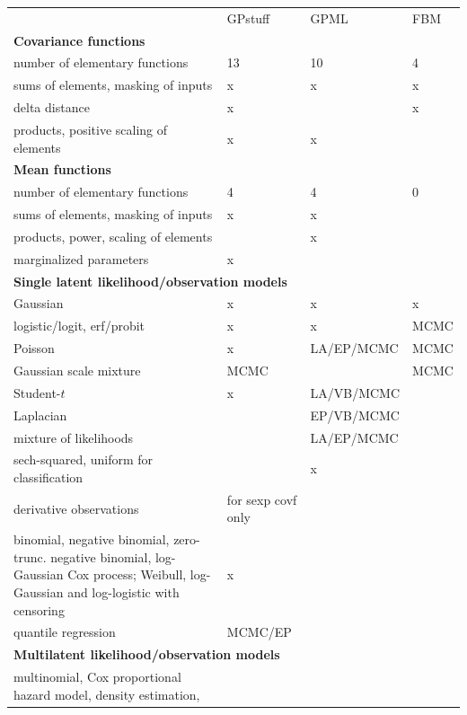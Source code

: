 \documentclass[twoside,11pt]{article}
\begin{document}
\begin{table}
  \scriptsize
  \begin{tabular}{p{9.5cm}p{2.3cm}p{2.1cm}p{0.9cm}}
    & GPstuff & GPML & FBM \\
    \textbf{Covariance functions} &  &  & \\
    \hline
    number of elementary functions & 13 & 10 & 4 \\
    sums of elements, masking of inputs  & x & x & x \\
    delta distance & x & & x \\
    products, positive scaling of elements & x & x &  \\    
    \multicolumn{4}{l}{\textbf{Mean functions}} \\
    \hline
    number of elementary functions & 4 & 4 & 0 \\
    sums of elements, masking of inputs & x & x & \\
    products, power, scaling of elements &  & x &  \\
    marginalized parameters  & x &  &  \\
    \multicolumn{4}{l}{\textbf{Single latent likelihood/observation models}}  \\
    \hline
    Gaussian & x & x & x \\
    logistic/logit, erf/probit & x & x & MCMC\\
    Poisson & x & LA/EP/MCMC & MCMC \\
    Gaussian scale mixture & MCMC &  & MCMC\\
    Student-$t$ & x & LA/VB/MCMC & \\
    Laplacian &  & EP/VB/MCMC & \\
    mixture of likelihoods &   &  LA/EP/MCMC  & \\
    sech-squared, uniform for classification &  & x & \\
    derivative observations & for sexp covf only &  & \\
    \hangindent=0.3cm binomial, negative binomial, zero-trunc. negative binomial, 
    log-Gaussian Cox process; Weibull, log-Gaussian and log-logistic with censoring & x &  & \\
    quantile regression & MCMC/EP & & \\
    \multicolumn{4}{l}{\textbf{Multilatent likelihood/observation models}} \\
    \hline
    \hangindent=0.3cm multinomial, Cox proportional hazard model, density estimation,

\end{tabular}
\end{table}
\end{document}
